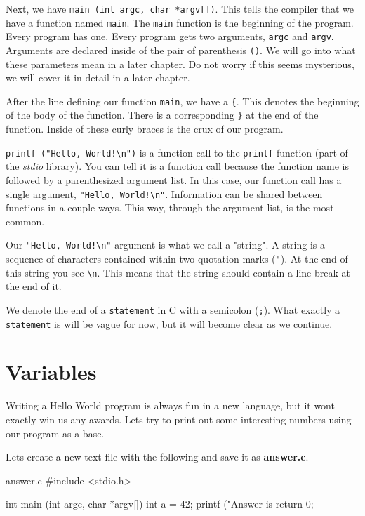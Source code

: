 \documentclass[12pt]{article}
\newcommand{\file}[1]{{\bf\ttfamily #1}}
\newcommand{\ident}[1]{{\it\ttfamily #1}}
\begin{document}
Next, we have \verb|main (int argc, char *argv[])|. This tells the compiler
that we have a function named \verb|main|. The \verb|main| function is the
beginning of the program.  Every program has one. Every program gets two
arguments, \verb|argc| and \verb|argv|. Arguments are declared inside of the
pair of parenthesis \verb|()|. We will go into what these parameters mean in a
later chapter. Do not worry if this seems mysterious, we will cover it in detail
in a later chapter.

After the line defining our function \verb|main|, we have a \verb|{|. This
denotes the beginning of the body of the function. There is a corresponding
\verb|}| at the end of the function. Inside of these curly braces is the crux
of our program.

\verb|printf ("Hello, World!\n")| is a function call to the \verb|printf|
function (part of the \ident{stdio} library). You can tell it is a function call
because the function name is followed by a parenthesized argument list.  In this
case, our function call has a single argument, \verb|"Hello, World!\n"|.
Information can be shared between functions in a couple ways. This way, through
the argument list, is the most common.

Our \verb|"Hello, World!\n"| argument is what we call a "string". A string is a
sequence of characters contained within two quotation marks (\verb|"|).  At the
end of this string you see \verb|\n|.  This means that the string should contain
a line break at the end of it.

We denote the end of a \verb|statement| in C with a semicolon (\verb|;|).
What exactly a \verb|statement| is will be vague for now, but it will become
clear as we continue.

\section{Variables}

Writing a Hello World program is always fun in a new language, but it wont
exactly win us any awards. Lets try to print out some interesting numbers
using our program as a base.

Lets create a new text file with the following and save it as \file{answer.c}.

\begin{code}{answer.c}
#include <stdio.h>

int
main (int   argc,
      char *argv[])
{
    int a = 42;
    printf ("Answer is %
    return 0;
}
\end{code}
\end{document}
